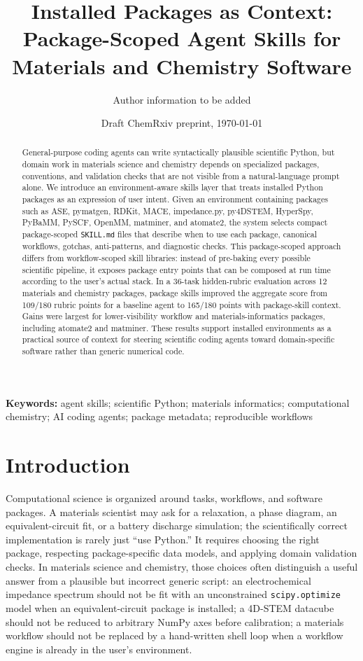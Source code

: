 \documentclass[11pt]{article}
\title{Installed Packages as Context: Package-Scoped Agent Skills for Materials and Chemistry Software}
\author[1]{Author information to be added}
\affil[1]{Affiliation to be added}
\date{Draft ChemRxiv preprint, \today}
\begin{document}
\maketitle

\begin{abstract}
General-purpose coding agents can write syntactically plausible scientific Python, but domain work in materials science and chemistry depends on specialized packages, conventions, and validation checks that are not visible from a natural-language prompt alone. We introduce an environment-aware skills layer that treats installed Python packages as an expression of user intent. Given an environment containing packages such as ASE, pymatgen, RDKit, MACE, impedance.py, py4DSTEM, HyperSpy, PyBaMM, PySCF, OpenMM, matminer, and atomate2, the system selects compact package-scoped \texttt{SKILL.md} files that describe when to use each package, canonical workflows, gotchas, anti-patterns, and diagnostic checks. This package-scoped approach differs from workflow-scoped skill libraries: instead of pre-baking every possible scientific pipeline, it exposes package entry points that can be composed at run time according to the user's actual stack. In a 36-task hidden-rubric evaluation across 12 materials and chemistry packages, package skills improved the aggregate score from 109/180 rubric points for a baseline agent to 165/180 points with package-skill context. Gains were largest for lower-visibility workflow and materials-informatics packages, including atomate2 and matminer. These results support installed environments as a practical source of context for steering scientific coding agents toward domain-specific software rather than generic numerical code.
\end{abstract}

\noindent\textbf{Keywords:} agent skills; scientific Python; materials informatics; computational chemistry; AI coding agents; package metadata; reproducible workflows

\section{Introduction}

Computational science is organized around tasks, workflows, and software packages. A materials scientist may ask for a relaxation, a phase diagram, an equivalent-circuit fit, or a battery discharge simulation; the scientifically correct implementation is rarely just ``use Python.'' It requires choosing the right package, respecting package-specific data models, and applying domain validation checks. In materials science and chemistry, those choices often distinguish a useful answer from a plausible but incorrect generic script: an electrochemical impedance spectrum should not be fit with an unconstrained \texttt{scipy.optimize} model when an equivalent-circuit package is installed; a 4D-STEM datacube should not be reduced to arbitrary NumPy axes before calibration; a materials workflow should not be replaced by a hand-written shell loop when a workflow engine is already in the user's environment.
\end{document}
